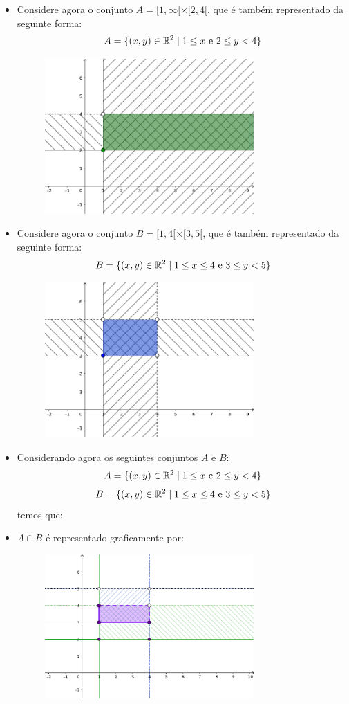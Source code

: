 \begin{itemize}
 \item Considere agora o conjunto $A= [1, \infty[ \times [2, 4[$, que é também representado da seguinte forma:
 \[A= \{(x, y) \in \mathbb{R}^2 \mid 1 \leq x \text{ e } 2 \leq y < 4 \}\]
   \begin{figure}[H]
 \centering
 \includegraphics[width=8cm]{./cap_conjnum/figs/cartesiano1infty24}
 \end{figure}

 \item Considere agora o conjunto $B= [1, 4[ \times [3, 5[$, que é também representado da seguinte forma:
 \[B= \{(x, y) \in \mathbb{R}^2 \mid 1 \leq x \leq 4 \text{ e } 3 \leq y < 5 \}\]
   \begin{figure}[H]
 \centering
 \includegraphics[width=8cm]{./cap_conjnum/figs/cartesiano1435}
 \end{figure}

 \item Considerando agora os seguintes conjuntos $A$ e $B$:
 \[A= \{(x, y) \in \mathbb{R}^2 \mid 1 \leq x \text{ e } 2 \leq y < 4 \}\]
 \[B= \{(x, y) \in \mathbb{R}^2 \mid 1 \leq x \leq 4 \text{ e } 3 \leq y < 5 \}\]
 temos que:

 \item $A \cap B$ é representado graficamente por:
    \begin{figure}[H]
 \centering
 \includegraphics[width=8cm]{./cap_conjnum/figs/cartesianointersecao}
 \end{figure}


\end{itemize}
